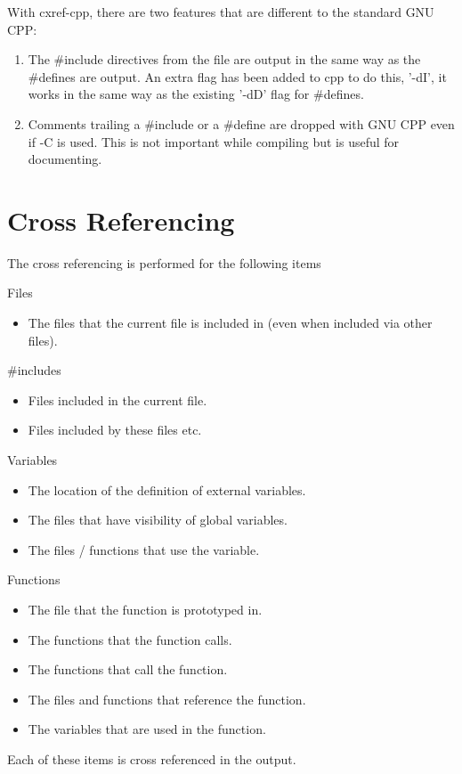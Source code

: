 \documentclass{report}
\begin{document}
With cxref-cpp, there are two features that are different to the standard GNU
CPP:

\begin{enumerate}
\item
The \#include directives from the file are output in the same way as the
\#defines are output.  An extra flag has been added to cpp to do this, '-dI',
it works in the same way as the existing '-dD' flag for \#defines.
\item
Comments trailing a \#include or a \#define are dropped with GNU CPP even if -C
is used. This is not important while compiling but is useful for documenting.
\end{enumerate}

\section{Cross Referencing}

The cross referencing is performed for the following items
\begin{list}{}{\leftmargin=1in }
\item[Files]
\begin{itemize}
\item The files that the current file is included in
(even when included via other files).
\end{itemize}
\item[\#includes]
\begin{itemize}
\item Files included in the current file.
\item Files included by these files etc.
\end{itemize}
\item[Variables]
\begin{itemize}
\item The location of the definition of external variables.
\item The files that have visibility of global variables.
\item The files / functions that use the variable.
\end{itemize}
\item[Functions]
\begin{itemize}
\item The file that the function is prototyped in.
\item The functions that the function calls.
\item The functions that call the function.
\item The files and functions that reference the function.
\item The variables that are used in the function.
\end{itemize}
\end{list}
Each of these items is cross referenced in the output.
\end{document}
